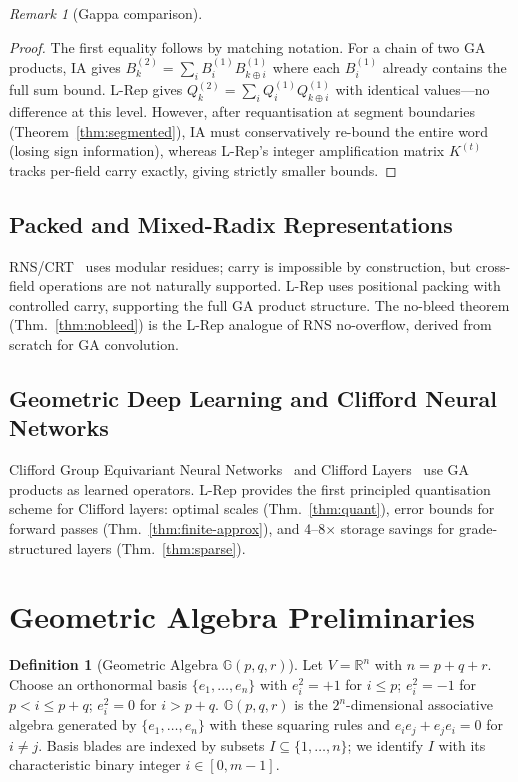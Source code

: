 \documentclass[11pt,a4paper]{article}
\theoremstyle{definition}
\newtheorem{definition}{Definition}[section]
\theoremstyle{plain}
\theoremstyle{remark}
\newtheorem{remark}{Remark}[section]
\newcommand{\GA}{\mathbb{G}}
\newcommand{\reals}{\mathbb{R}}
\begin{document}
\begin{remark}[Gappa comparison]
\begin{proof}
The first equality follows by matching notation.
For a chain of two GA products,
IA gives $B_k^{(2)} = \sum_i B_i^{(1)} B_{k\oplus i}^{(1)}$
where each $B_i^{(1)}$ already contains the full sum bound.
L-Rep gives $Q_k^{(2)} = \sum_i Q_i^{(1)} Q_{k\oplus i}^{(1)}$ with
identical values---no difference at this level.
However, after requantisation at segment boundaries (Theorem~\ref{thm:segmented}),
IA must conservatively re-bound the entire word (losing sign information),
whereas L-Rep's integer amplification matrix $K^{(t)}$ tracks per-field
carry exactly, giving strictly smaller bounds.
\end{proof}

\subsection{Packed and Mixed-Radix Representations}

RNS/CRT~\cite{crt_fpga} uses modular residues; carry is impossible by
construction, but cross-field operations are not naturally supported.
L-Rep uses positional packing with controlled carry, supporting the
full GA product structure.
The no-bleed theorem (Thm.~\ref{thm:nobleed}) is the L-Rep analogue of
RNS no-overflow, derived from scratch for GA convolution.

\subsection{Geometric Deep Learning and Clifford Neural Networks}

Clifford Group Equivariant Neural Networks~\cite{ruhe2023} and
Clifford Layers~\cite{brandstetter2023} use GA products as learned operators.
L-Rep provides the first principled quantisation scheme for Clifford
layers: optimal scales (Thm.~\ref{thm:quant}), error bounds for
forward passes (Thm.~\ref{thm:finite-approx}), and 4--8$\times$ storage
savings for grade-structured layers (Thm.~\ref{thm:sparse}).

\section{Geometric Algebra Preliminaries}
\label{sec:prelim}

\begin{definition}[Geometric Algebra $\GA(p,q,r)$]
Let $V = \reals^n$ with $n = p+q+r$.
Choose an orthonormal basis $\{e_1,\ldots,e_n\}$ with $e_i^2=+1$ for
$i\le p$; $e_i^2=-1$ for $p<i\le p+q$; $e_i^2=0$ for $i>p+q$.
$\GA(p,q,r)$ is the $2^n$-dimensional associative algebra generated by
$\{e_1,\ldots,e_n\}$ with these squaring rules and $e_ie_j+e_je_i=0$
for $i\ne j$.
Basis blades are indexed by subsets $I\subseteq\{1,\ldots,n\}$;
we identify $I$ with its characteristic binary integer $i\in[0,m-1]$.
\end{definition}


\end{remark}
\end{document}
